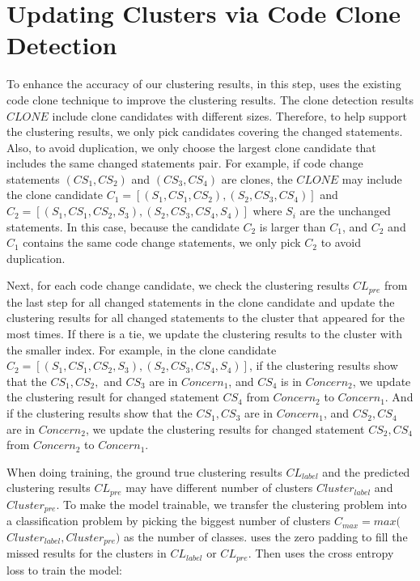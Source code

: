 \section{Updating Clusters via Code Clone Detection}

To enhance the accuracy of our clustering results, in this step, \tool uses the existing code clone technique \cite{svajlenko2017fast} to improve the clustering results. The clone detection results $CLONE$ include clone candidates with different sizes. Therefore, to help support the clustering results, we only pick candidates covering the changed statements. Also, to avoid duplication, we only choose the largest clone candidate that includes the same changed statements pair. For example, if code change statements $(CS_1, CS_2)$ and $(CS_3, CS_4)$ are clones, the $CLONE$ may include the clone candidate $C_1 = [(S_1, CS_1, CS_2), (S_2, CS_3, CS_4)]$ and $C_2= [(S_1, CS_1, CS_2, S_3), (S_2, CS_3, CS_4, S_4)]$ where $S_i$ are the unchanged statements. In this case, because the candidate $C_2$ is larger than $C_1$, and $C_2$ and $C_1$ contains the same code change statements, we only pick $C_2$ to avoid duplication. 

Next, for each code change candidate, we check the clustering results $CL_{pre}$ from the last step for all changed statements in the clone candidate and update the clustering results for all changed statements to the cluster that appeared for the most times. If there is a tie, we update the clustering results to the cluster with the smaller index. For example, in the clone candidate $C_2= [(S_1, CS_1, CS_2, S_3), (S_2, CS_3, CS_4, S_4)]$, if the clustering results show that the $CS_1, CS_2,$ and $CS_3$ are in $Concern_1$, and $CS_4$ is in $Concern_2$, we update the clustering result for changed statement $CS_4$ from $Concern_2$ to $Concern_1$. And if the clustering results show that the $CS_1, CS_3$ are in $Concern_1$, and $CS_2, CS_4$ are in $Concern_2$, we update the clustering results for changed statement $CS_2, CS_4$ from $Concern_2$ to $Concern_1$.


{\color{red}{loss function}}

When doing training, the ground true clustering results $CL_{label}$ and the predicted clustering results $CL_{pre}$ may have different number of clusters $Cluster_{label}$ and $Cluster_{pre}$. To make the model trainable, we transfer the clustering problem into a classification problem by picking the biggest number of clusters $C_{max} = max($ $Cluster_{label}, Cluster_{pre})$ as the number of classes. \tool uses the zero padding to fill the missed results for the clusters in $CL_{label}$ or $CL_{pre}$. Then \tool uses the cross entropy loss to train the model:

